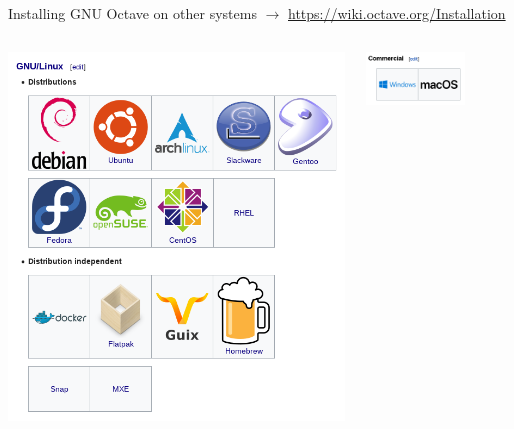 \begin{frame}{Installing GNU Octave on other systems}
$\rightarrow$ \url{https://wiki.octave.org/Installation}

\begin{columns}
\begin{column}{0.5\textwidth}
\includegraphics[width=\textwidth]{res/images/octave_wiki_install_linux}
\end{column}
\begin{column}{0.35\textwidth}
\includegraphics[width=0.68\textwidth]{res/images/octave_wiki_install_commercial}


\end{column}
\end{columns}
\end{frame}
